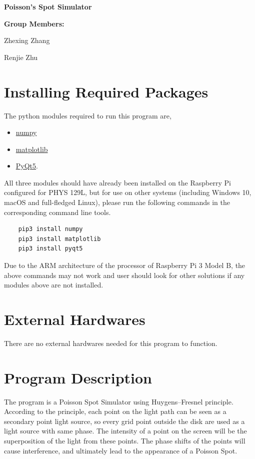 \documentclass[12pt]{article}
\begin{document}
\begin{center}
    \textbf{\Large Poisson's Spot Simulator}
\end{center}

\textbf{Group Members:}

\qquad Zhexing Zhang

\qquad Renjie Zhu

\section{Installing Required Packages}

The python modules required to run this program are,
\begin{itemize}
    \item \href{http://www.numpy.org/}{numpy}
    \item \href{https://matplotlib.org/}{matplotlib}
    \item \href{https://pypi.org/project/PyQt5/}{PyQt5}.
\end{itemize}

All three modules should have already been installed on the 
Raspberry Pi configured for PHYS 129L, but for use on 
other systems (including Windows 10, macOS and full-fledged
Linux), please run the following commands in the corresponding
command line tools.

{\selectfont 
\begin{lstlisting}
    pip3 install numpy
    pip3 install matplotlib
    pip3 install pyqt5
\end{lstlisting}
}

Due to the ARM architecture of the processor of Raspberry 
Pi 3 Model B, the above commands may not work and user 
should look for other solutions if any modules above are 
not installed. 

\section{External Hardwares}

There are no external hardwares needed for this program to
function.

\section{Program Description}

The program is a Poisson Spot Simulator using Huygens–Fresnel 
principle. According to the principle, each point on the 
light path can be seen as a secondary point light source, 
so every grid point outside the disk are used as a light 
source with same phase. The intensity of a point on the screen 
will be the superposition of the light from these points. 
The phase shifts of the points will cause interference, and 
ultimately lead to the appearance of a Poisson Spot.
\end{document}

